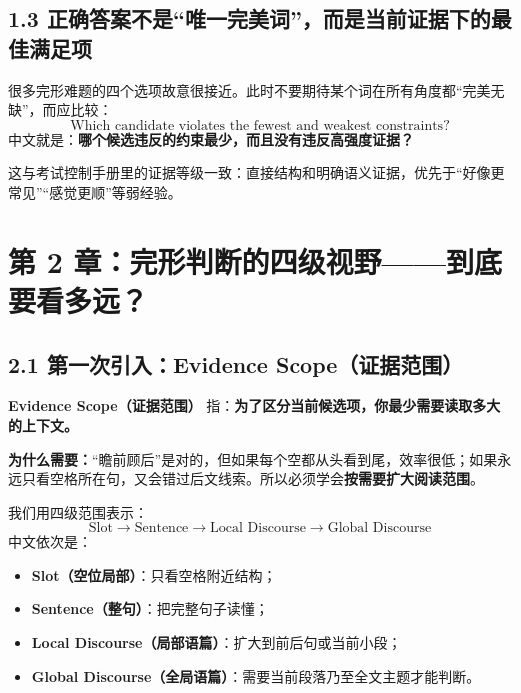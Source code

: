 \documentclass[11pt,a4paper]{ctexart}
\newcommand{\kw}[1]{\textbf{#1}}
\newcommand{\term}[2]{\textbf{#1（#2）}}
\begin{document}
\subsection{1.3 正确答案不是“唯一完美词”，而是当前证据下的最佳满足项}
很多完形难题的四个选项故意很接近。此时不要期待某个词在所有角度都“完美无缺”，而应比较：
\[
\boxed{
\text{Which candidate violates the fewest and weakest constraints?}
}
\]
中文就是：\kw{哪个候选违反的约束最少，而且没有违反高强度证据？}

这与考试控制手册里的证据等级一致：直接结构和明确语义证据，优先于“好像更常见”“感觉更顺”等弱经验。

\newpage
\section{第 2 章：完形判断的四级视野——到底要看多远？}

\subsection{2.1 第一次引入：Evidence Scope（证据范围）}
\term{Evidence Scope}{证据范围} 指：\kw{为了区分当前候选项，你最少需要读取多大的上下文。}

\kw{为什么需要：}“瞻前顾后”是对的，但如果每个空都从头看到尾，效率很低；如果永远只看空格所在句，又会错过后文线索。所以必须学会\kw{按需要扩大阅读范围}。

我们用四级范围表示：
\[
\boxed{
\text{Slot}
\rightarrow
\text{Sentence}
\rightarrow
\text{Local Discourse}
\rightarrow
\text{Global Discourse}
}
\]
中文依次是：
\begin{itemize}
  \item \term{Slot}{空位局部}：只看空格附近结构；
  \item \term{Sentence}{整句}：把完整句子读懂；
  \item \term{Local Discourse}{局部语篇}：扩大到前后句或当前小段；
  \item \term{Global Discourse}{全局语篇}：需要当前段落乃至全文主题才能判断。
\end{itemize}
\end{document}
